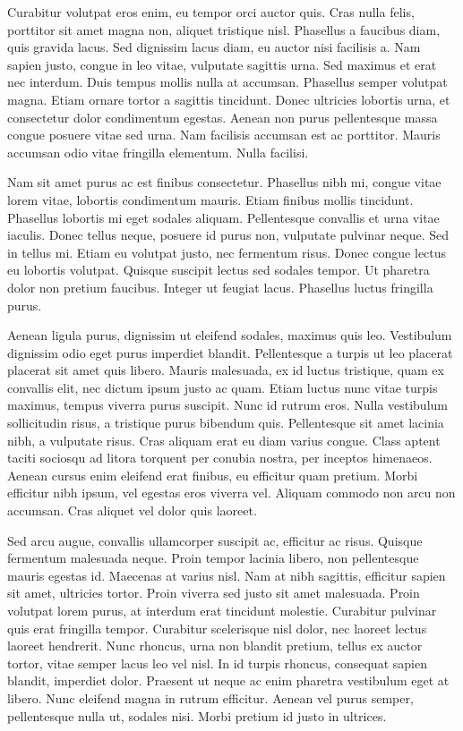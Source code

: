 \documentclass{novel}
\begin{document}
Curabitur volutpat eros enim, eu tempor orci auctor quis. Cras nulla felis, porttitor sit amet magna non, aliquet tristique nisl. Phasellus a faucibus diam, quis gravida lacus. Sed dignissim lacus diam, eu auctor nisi facilisis a. Nam sapien justo, congue in leo vitae, vulputate sagittis urna. Sed maximus et erat nec interdum. Duis tempus mollis nulla at accumsan. Phasellus semper volutpat magna. Etiam ornare tortor a sagittis tincidunt. Donec ultricies lobortis urna, et consectetur dolor condimentum egestas. Aenean non purus pellentesque massa congue posuere vitae sed urna. Nam facilisis accumsan est ac porttitor. Mauris accumsan odio vitae fringilla elementum. Nulla facilisi.

Nam sit amet purus ac est finibus consectetur. Phasellus nibh mi, congue vitae lorem vitae, lobortis condimentum mauris. Etiam finibus mollis tincidunt. Phasellus lobortis mi eget sodales aliquam. Pellentesque convallis et urna vitae iaculis. Donec tellus neque, posuere id purus non, vulputate pulvinar neque. Sed in tellus mi. Etiam eu volutpat justo, nec fermentum risus. Donec congue lectus eu lobortis volutpat. Quisque suscipit lectus sed sodales tempor. Ut pharetra dolor non pretium faucibus. Integer ut feugiat lacus. Phasellus luctus fringilla purus.

Aenean ligula purus, dignissim ut eleifend sodales, maximus quis leo. Vestibulum dignissim odio eget purus imperdiet blandit. Pellentesque a turpis ut leo placerat placerat sit amet quis libero. Mauris malesuada, ex id luctus tristique, quam ex convallis elit, nec dictum ipsum justo ac quam. Etiam luctus nunc vitae turpis maximus, tempus viverra purus suscipit. Nunc id rutrum eros. Nulla vestibulum sollicitudin risus, a tristique purus bibendum quis. Pellentesque sit amet lacinia nibh, a vulputate risus. Cras aliquam erat eu diam varius congue. Class aptent taciti sociosqu ad litora torquent per conubia nostra, per inceptos himenaeos. Aenean cursus enim eleifend erat finibus, eu efficitur quam pretium. Morbi efficitur nibh ipsum, vel egestas eros viverra vel. Aliquam commodo non arcu non accumsan. Cras aliquet vel dolor quis laoreet.

Sed arcu augue, convallis ullamcorper suscipit ac, efficitur ac risus. Quisque fermentum malesuada neque. Proin tempor lacinia libero, non pellentesque mauris egestas id. Maecenas at varius nisl. Nam at nibh sagittis, efficitur sapien sit amet, ultricies tortor. Proin viverra sed justo sit amet malesuada. Proin volutpat lorem purus, at interdum erat tincidunt molestie. Curabitur pulvinar quis erat fringilla tempor. Curabitur scelerisque nisl dolor, nec laoreet lectus laoreet hendrerit. Nunc rhoncus, urna non blandit pretium, tellus ex auctor tortor, vitae semper lacus leo vel nisl. In id turpis rhoncus, consequat sapien blandit, imperdiet dolor. Praesent ut neque ac enim pharetra vestibulum eget at libero. Nunc eleifend magna in rutrum efficitur. Aenean vel purus semper, pellentesque nulla ut, sodales nisi. Morbi pretium id justo in ultrices.
\end{document}
